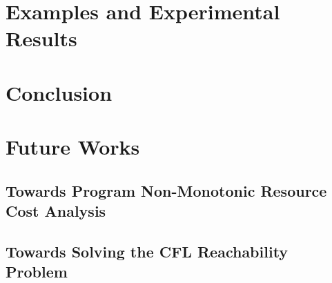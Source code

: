 \documentclass[12pt, letterpaper]{report}   %
\begin{document}
\chapter{Examples and Experimental Results}
\label{sec:reachability-example}



\chapter*{}



\chapter{Conclusion}
\label{sec:conclusion}

\clearpage
%
\chapter{Future Works}
\label{sec:future}
\section{Towards Program Non-Monotonic Resource Cost Analysis}
\label{sec:future-cost}


\section{Towards Solving the CFL Reachability Problem}
\label{sec:future-cfl}



\cleardoublepage


\nocite{tikzDevice,plotly,reshape,Rcomputing,Florida2000}

\end{document}
